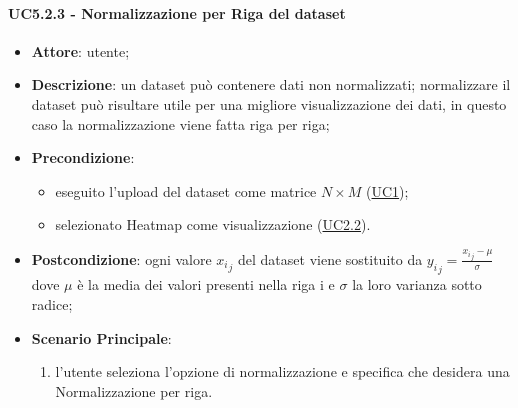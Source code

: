     \paragraph{UC5.2.3 - Normalizzazione per Riga del dataset}
    \label{uc5.2.3}
    \begin{itemize}
    \item \textbf{Attore}: utente;
    \item \textbf{Descrizione}: un dataset può contenere dati non normalizzati; normalizzare il dataset può risultare utile per una migliore visualizzazione dei dati, in questo caso la normalizzazione viene fatta riga per riga;
    \item \textbf{Precondizione}: 
    \begin{itemize}
        \item eseguito l'upload del dataset come matrice $N\times M$ (\hyperref[uc1]{UC1});
        \item selezionato Heatmap come visualizzazione (\hyperref[uc2.2]{UC2.2}).
    \end{itemize}  
    \item \textbf{Postcondizione}: ogni valore ${x_i}_j$ del dataset viene sostituito da $ {y_i}_j = \frac{{x_i}_j - \mu}{\sigma}$ dove $\mu$ è la media dei valori presenti nella riga i e $\sigma$ la loro varianza sotto radice;
    \item \textbf{Scenario Principale}: 
    \begin{enumerate}
        \item l'utente seleziona l'opzione di normalizzazione e specifica che desidera una Normalizzazione per riga.
    \end{enumerate}  
    \end{itemize}
    
